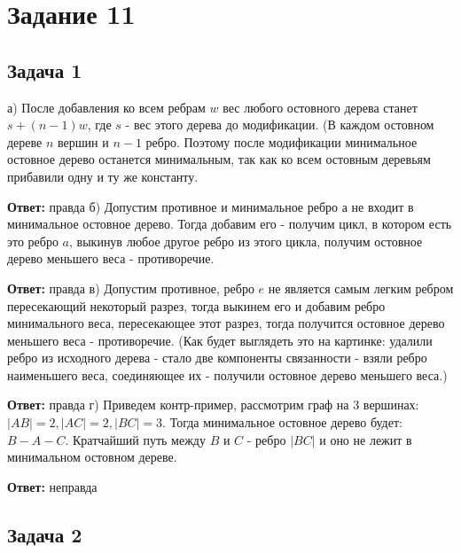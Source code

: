 \documentclass[a4paper,14pt]{article} %
\begin{document}

\section{Задание 11}
\subsection{Задача 1}

а) После добавления ко всем ребрам $w$ вес любого остовного дерева станет $s + (n - 1)w$,  где $s$ - вес этого дерева до модификации.  
(В каждом остовном дереве $n$ вершин и $n - 1$ ребро.  Поэтому после модификации минимальное остовное дерево останется минимальным,  так как ко всем остовным деревьям прибавили одну и ту же константу.

\textbf{Ответ:} правда
\newline
б) Допустим противное и минимальное ребро $а$ не входит в минимальное остовное дерево.  
Тогда добавим его - получим цикл,  в котором есть это ребро $a$,  выкинув любое другое ребро из этого цикла,  получим остовное дерево меньшего веса - противоречие.  

\textbf{Ответ:} правда
\newline
в) Допустим противное,  ребро $e$ не является самым легким ребром пересекающий некоторый разрез,  тогда выкинем его и добавим ребро минимального веса,  пересекающее этот разрез,  тогда получится остовное дерево меньшего веса - противоречие.  
(Как будет выглядеть это на картинке: удалили ребро из исходного дерева - стало две компоненты связанности - взяли ребро наименьшего веса,  соединяющее их - получили остовное дерево меньшего веса.)

\textbf{Ответ:} правда
\newline
г) Приведем контр-пример,  рассмотрим граф на 3 вершинах: $|AB| = 2,  |AC| = 2,  |BC| = 3$.  Тогда минимальное остовное дерево будет: $B - A - C$.  Кратчайший путь между $B$ и $C$ - ребро $|BC|$ и оно не лежит в минимальном остовном дереве.

\textbf{Ответ:} неправда
 

\subsection*{Задача 2}
 
\end{document}
